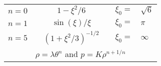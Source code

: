 \begin{frame}
	\begin{figure}
		\centering
		\begin{tabular}[b]{@{}lcccrl@{}}
			\toprule
			$n=0$ && $\displaystyle 1-\xi^2/6$ && $\xi_0=$&$\sqrt{6}$\\[1ex]
			$n=1$ && $\displaystyle \sin(\xi)/\xi$ && $\xi_0=$&$\pi$\\[1ex]
			$n=5$ && $\displaystyle \left(1+\xi^2/3\right)^{-1/2}$ && $\xi_0=$&$\infty$\\[1ex]
			\multicolumn{6}{c}{$\rho=\lambda\theta^n$ and $p=K\rho^{n+1/n}$}\\[1ex]
			\bottomrule
		\end{tabular}
	\end{figure}
\end{frame}

